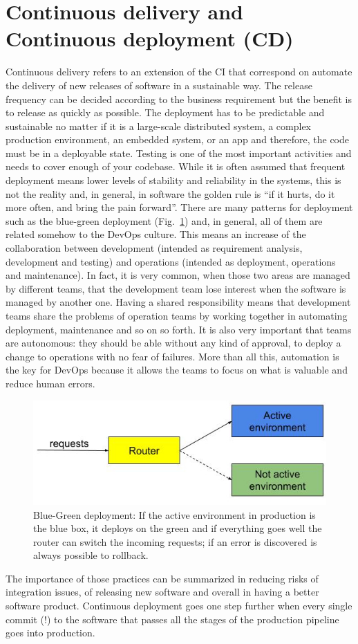 \documentclass[a4paper,
               keeplastbox,   %
               ]{jacow}
\begin{document}
\section{Continuous delivery and Continuous deployment (CD)}
Continuous delivery refers to an extension of the CI that correspond on automate the delivery of new releases of software in a sustainable way. The release frequency can be decided according to the business requirement but the benefit is to release as quickly as possible. 
The deployment has to be predictable and sustainable no matter if it is a large-scale distributed system, a complex production environment, an embedded system, or an app and therefore, the code must be in a deployable state. Testing is one of the most important activities and needs to cover enough of your codebase. 
While it is often assumed that frequent deployment means lower levels of stability and reliability in the systems, this is not the reality and, in general, in software the golden rule is “if it hurts, do it more often, and bring the pain forward”.
There are many patterns for deployment such as the blue-green deployment (Fig.~\ref{fig:bluegreendeploy}) and, in general, all of them are related somehow to the DevOps culture. This means an increase of the collaboration between development (intended as requirement analysis, development and testing) and operations (intended as deployment, operations and maintenance). In fact, it is very common, when those two areas are managed by different teams, that the development team lose interest when the software is managed by another one. Having a shared responsibility means that development teams share the problems of operation teams by working together in automating deployment, maintenance and so on so forth. It is also very important that teams are autonomous: they should be able without any kind of approval, to deploy a change to operations with no fear of failures. 
More than all this, automation is the key for DevOps because it allows the teams to focus on what is valuable and reduce human errors.
\begin{figure}[!htb]
   \centering
   \includegraphics*[width=1\columnwidth]{BlueGreenDeploy}
   \caption{Blue-Green deployment: If the active environment in production is the blue box, it deploys on the green and if everything goes well the router can switch the incoming requests; if an error is discovered is always possible to rollback.}
   \label{fig:bluegreendeploy}
\end{figure}
The importance of those practices can be summarized in reducing risks of integration issues, of releasing new software and overall in having a better software product. 
Continuous deployment goes one step further when every single commit (!) to the software that passes all the stages of the production pipeline goes into production. 
\end{document}

